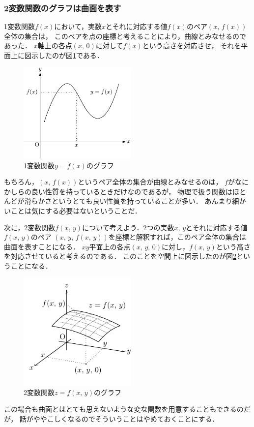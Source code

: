 \subsubsection{2変数関数のグラフは曲面を表す}
1変数関数$f(x)$において，実数$x$とそれに対応する値$f(x)$のペア$(x, \, f(x))$全体の集合は，
このペアを点の座標と考えることにより，曲線とみなせるのであった．
$x$軸上の各点$(x, \, 0)$に対して$f(x)$という高さを対応させ，
それを平面上に図示したのが図\ref{fig:f(x)}である．
\begin{figure}[h]
 \centering
 \includegraphics[width=5.8cm]{picture/henbibun1.pdf}
 \caption{1変数関数$y=f(x)$のグラフ}
 \label{fig:f(x)}
\end{figure} 

もちろん，$(x, \, f(x))$というペア全体の集合が曲線とみなせるのは，
$f$がなにかしらの良い性質を持っているときだけなのであるが，
物理で扱う関数はほとんどが滑らかさというとても良い性質を持っていることが多い．
あんまり細かいことは気にする必要はないということだ．

次に，2変数関数$f(x, \, y)$について考えよう．2つの実数$x, \, y$とそれに対応する値$f(x, \, y)$のペア
$(x, \, y, \, f(x, \, y))$を座標と解釈すれば，このペア全体の集合は曲面を表すことになる．
$xy$平面上の各点$(x, \, y, \, 0)$に対し，$f(x, \, y)$という高さを対応させていると考えるのである．
このことを空間上に図示したのが図\ref{fig:f(x,y)}ということになる．
\newpage
\begin{figure}[h]
 \centering
 \includegraphics[width=5.8cm]{picture/henbibun2.pdf}
 \caption{2変数関数$z=f(x, \, y)$のグラフ}
 \label{fig:f(x,y)}
\end{figure} 
この場合も曲面とはとても思えないような変な関数を用意することもできるのだが，
話がややこしくなるのでそういうことはやめておくことにする．


